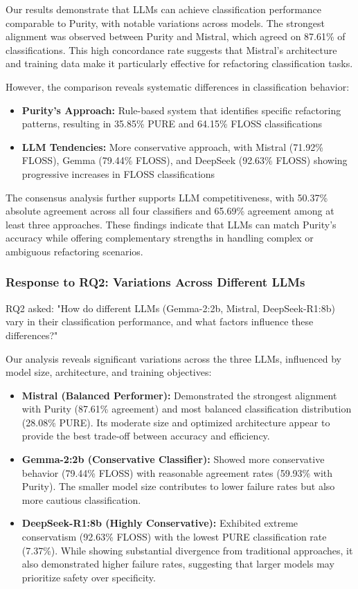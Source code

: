 Our results demonstrate that LLMs can achieve classification performance comparable to Purity, with notable variations across models. The strongest alignment was observed between Purity and Mistral, which agreed on 87.61\% of classifications. This high concordance rate suggests that Mistral's architecture and training data make it particularly effective for refactoring classification tasks.

However, the comparison reveals systematic differences in classification behavior:
\begin{itemize}
    \item \textbf{Purity's Approach:} Rule-based system that identifies specific refactoring patterns, resulting in 35.85\% PURE and 64.15\% FLOSS classifications
    \item \textbf{LLM Tendencies:} More conservative approach, with Mistral (71.92\% FLOSS), Gemma (79.44\% FLOSS), and DeepSeek (92.63\% FLOSS) showing progressive increases in FLOSS classifications
\end{itemize}

The consensus analysis further supports LLM competitiveness, with 50.37\% absolute agreement across all four classifiers and 65.69\% agreement among at least three approaches. These findings indicate that LLMs can match Purity's accuracy while offering complementary strengths in handling complex or ambiguous refactoring scenarios.

\subsubsection{Response to RQ2: Variations Across Different LLMs}

RQ2 asked: "How do different LLMs (Gemma-2:2b, Mistral, DeepSeek-R1:8b) vary in their classification performance, and what factors influence these differences?"

Our analysis reveals significant variations across the three LLMs, influenced by model size, architecture, and training objectives:

\begin{itemize}
    \item \textbf{Mistral (Balanced Performer):} Demonstrated the strongest alignment with Purity (87.61\% agreement) and most balanced classification distribution (28.08\% PURE). Its moderate size and optimized architecture appear to provide the best trade-off between accuracy and efficiency.
    
    \item \textbf{Gemma-2:2b (Conservative Classifier):} Showed more conservative behavior (79.44\% FLOSS) with reasonable agreement rates (59.93\% with Purity). The smaller model size contributes to lower failure rates but also more cautious classification.
    
    \item \textbf{DeepSeek-R1:8b (Highly Conservative):} Exhibited extreme conservatism (92.63\% FLOSS) with the lowest PURE classification rate (7.37\%). While showing substantial divergence from traditional approaches, it also demonstrated higher failure rates, suggesting that larger models may prioritize safety over specificity.
\end{itemize}

